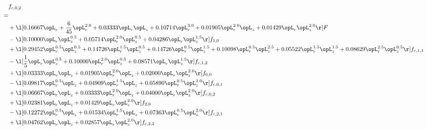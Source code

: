 \begin{alignat}{2} 
\label{eq:f_02_1} 
& f_{c,0,2} \nonumber \\ 
 = \\ 
& + \l[  0.16667 \opL_r + \frac{6}{45} \opL_r^{2.0} +  0.03333 \opL_r \opL_z +  0.10714 \opL_r^{3.0} +  0.01905 \opL_r^{2.0} \opL_z +  0.01429 \opL_r \opL_z^{2.0}  \r] F \nonumber \\ 
& - \l[  0.10000 \opL_r \opL_z^{0.5} +  0.05714 \opL_r^{2.0} \opL_z^{0.5} +  0.04286 \opL_r \opL_z^{1.5}  \r] f_{1,0} \nonumber \\ 
& + \l[  0.29452 \opL_r^{0.5} \opL_z^{0.5} +  0.14726 \opL_r^{1.5} \opL_z^{0.5} +  0.14726 \opL_r^{0.5} \opL_z^{1.5} +  0.10098 \opL_r^{0.5} \opL_z^{2.5} +  0.05522 \opL_r^{1.5} \opL_z^{1.5} +  0.08629 \opL_r^{2.5} \opL_z^{0.5}  \r] f_{c,1,1} \nonumber \\ 
& - \l[ \frac{1}{5} \opL_r \opL_z^{0.5} +  0.10000 \opL_r^{2.0} \opL_z^{0.5} +  0.08571 \opL_r \opL_z^{1.5}  \r] f_{c,1,2} \nonumber \\ 
& + \l[  0.03333 \opL_r \opL_z +  0.01905 \opL_r^{2.0} \opL_z +  0.02000 \opL_r \opL_z^{2.0}  \r] f_{0,0} \nonumber \\ 
& - \l[  0.09817 \opL_r^{0.5} \opL_z +  0.04909 \opL_r^{1.5} \opL_z +  0.05890 \opL_r^{0.5} \opL_z^{2.0}  \r] f_{c,0,1} \nonumber \\ 
& + \l[  0.06667 \opL_r \opL_z +  0.03333 \opL_r^{2.0} \opL_z +  0.04000 \opL_r \opL_z^{2.0}  \r] f_{c,0,2} \nonumber \\ 
& + \l[  0.02381 \opL_r \opL_z +  0.01429 \opL_r \opL_z^{2.0}  \r] f_{2,0} \nonumber \\ 
& - \l[  0.12272 \opL_r^{0.5} \opL_z +  0.01534 \opL_r^{1.5} \opL_z +  0.07363 \opL_r^{0.5} \opL_z^{2.0}  \r] f_{c,2,1} \nonumber \\ 
& + \l[  0.04762 \opL_r \opL_z +  0.02857 \opL_r \opL_z^{2.0}  \r] f_{c,2,2} \nonumber \\ 
\end{alignat} 



